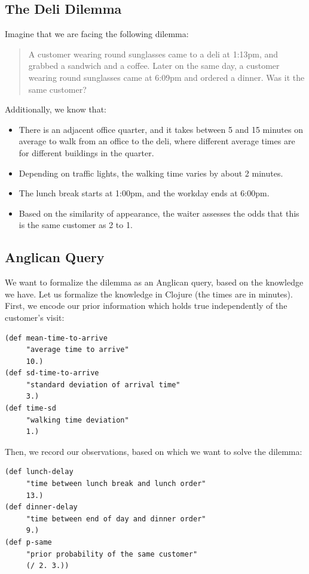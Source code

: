 \documentclass[preprint]{sigplanconf}
\begin{document}
\subsection{The Deli Dilemma}
\label{seq:deli}

Imagine that we are facing the following dilemma:
\begin{quote}
A customer wearing round sunglasses came to a deli at 1:13pm,
and grabbed a sandwich and a coffee. Later on the same day, a
customer wearing round sunglasses came at 6:09pm and ordered a
dinner.  Was it the same customer?
\end{quote}
Additionally, we know that:
\begin{itemize}
    \item There is an adjacent office quarter, and it takes
        between 5 and 15 minutes on average to walk from an
        office to the deli, where different average times are  for
        different buildings in the quarter.
    \item Depending on traffic lights, the walking time varies by about 2
        minutes.
    \item The lunch break starts at 1:00pm, and the workday ends at 6:00pm.
    \item Based on the similarity of appearance, the waiter assesses the odds that this is the same customer as 2 to 1.
\end{itemize}

\subsection{Anglican Query}
\label{seq:deli-query}

We want to formalize the dilemma as an Anglican query, based on
the knowledge we have. Let us formalize the knowledge in
Clojure (the times are in minutes). First, we encode our prior
information which holds true independently of the customer's
visit:

\begin{lstlisting}[style=default]
(def mean-time-to-arrive
     "average time to arrive"
     10.)
(def sd-time-to-arrive
     "standard deviation of arrival time"
     3.)
(def time-sd
     "walking time deviation"
     1.)
\end{lstlisting}

Then, we record our observations, based on which we want to
solve the dilemma:

\begin{lstlisting}[style=default]
(def lunch-delay
     "time between lunch break and lunch order"
     13.)
(def dinner-delay
     "time between end of day and dinner order"
     9.)
(def p-same
     "prior probability of the same customer"
     (/ 2. 3.))
\end{lstlisting}
\end{document}
